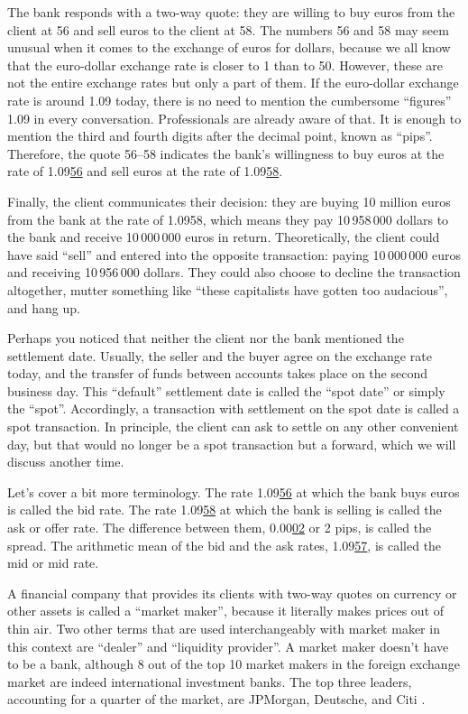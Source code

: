 \documentclass[a4paper,14pt]{extarticle}
\begin{document}
The bank responds with a two-way quote: they are willing to buy euros from the 
client at 56 and sell euros to the client at 58. The numbers 56 and 58 may seem 
unusual when it comes to the exchange of euros for dollars, because we all know 
that the euro-dollar exchange rate is closer to 1 than to 50. However, these 
are not the entire exchange rates but only a part of them. If the euro-dollar 
exchange rate is around 1.09 today, there is no need to mention the cumbersome 
``figures'' 1.09 in every conversation. Professionals are already aware of that. 
It is enough to mention the third and fourth digits after the decimal point, 
known as ``pips''. Therefore, the quote 56--58 indicates the bank's willingness 
to buy euros at the rate of 1.09\underline{56} and sell euros at the rate of 
1.09\underline{58}.

Finally, the client communicates their decision: they are buying 10 million 
euros from the bank at the rate of 1.0958, which means they pay 10\,958\,000 
dollars to the bank and receive 10\,000\,000 euros in return. Theoretically, the 
client could have said ``sell'' and entered into the opposite transaction: 
paying 10\,000\,000 euros and receiving 10\,956\,000 dollars. They could also 
choose to decline the transaction altogether, mutter something like ``these 
capitalists have gotten too audacious'', and hang up.

Perhaps you noticed that neither the client nor the bank mentioned the 
settlement date. Usually, the seller and the buyer agree on the exchange rate 
today, and the transfer of funds between accounts takes place on the second 
business day. This ``default'' settlement date is called the ``spot date'' or 
simply the ``spot''. Accordingly, a transaction with settlement on the spot date 
is called a spot transaction. In principle, the client can ask to settle on any 
other convenient day, but that would no longer be a spot transaction but a 
forward, which we will discuss another time.

Let's cover a bit more terminology. The rate 1.09\underline{56} at which the 
bank buys euros is called the bid rate. The rate 1.09\underline{58} at which the 
bank is selling is called the ask or offer rate. The difference between them, 
0.00\underline{02} or 2 pips, is called the spread. The arithmetic mean of the 
bid and the ask rates, 1.09\underline{57}, is called the mid or mid rate.

A financial company that provides its clients with two-way quotes on currency or 
other assets is called a ``market maker'', because it literally makes prices out 
of thin air. Two other terms that are used interchangeably with market maker in 
this context are ``dealer'' and ``liquidity provider''. A market maker doesn't 
have to be a bank, although 8 out of the top 10 market makers in the foreign 
exchange market are indeed international investment banks. The top three 
leaders, accounting for a quarter of the market, are JPMorgan, Deutsche, and 
Citi \cite{euromoney2019}.
\end{document}
